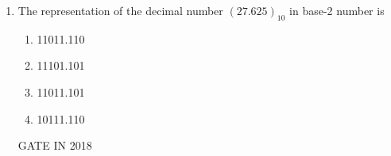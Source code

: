 \begin{enumerate}  

\item 
\label{prob:gate IN 18}
The representation of the decimal number $(27.625)_{10}$ in base-2 number is

\begin{enumerate}[label=(\Alph*)]
    \item 11011.110
    \item 11101.101
    \item 11011.101
    \item 10111.110
\end{enumerate}

\hfill{GATE IN 2018}

\end{enumerate}

